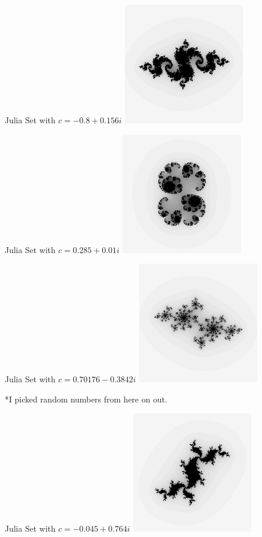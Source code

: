 \documentclass{beamer}
\begin{document}
\begin{center}
\begin{frame}
Julia Set with $c = -0.8 + 0.156i$
\includegraphics{Julia1}
\end{frame}

\begin{frame}
Julia Set with $c = 0.285 + 0.01i$
\includegraphics{Julia2}
\end{frame}

\begin{frame}
Julia Set with $c = 0.70176 - 0.3842i$
\includegraphics{Julia3}
\end{frame}

\begin{frame}
*I picked random numbers from here on out.
\end{frame}

\begin{frame}
Julia Set with $c = -0.045 + 0.764i$
\includegraphics{Julia4}
\end{frame}


\end{center}
\end{document}
